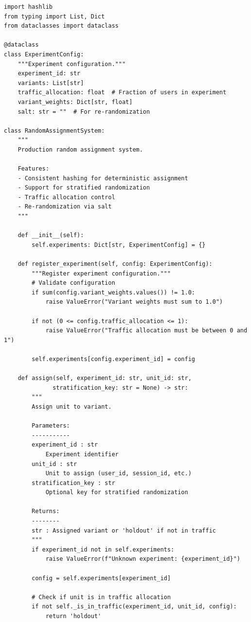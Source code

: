 \lstset{language=Python, caption=Production Random Assignment System}
\begin{lstlisting}
import hashlib
from typing import List, Dict
from dataclasses import dataclass

@dataclass
class ExperimentConfig:
    """Experiment configuration."""
    experiment_id: str
    variants: List[str]
    traffic_allocation: float  # Fraction of users in experiment
    variant_weights: Dict[str, float]
    salt: str = ""  # For re-randomization

class RandomAssignmentSystem:
    """
    Production random assignment system.

    Features:
    - Consistent hashing for deterministic assignment
    - Support for stratified randomization
    - Traffic allocation control
    - Re-randomization via salt
    """

    def __init__(self):
        self.experiments: Dict[str, ExperimentConfig] = {}

    def register_experiment(self, config: ExperimentConfig):
        """Register experiment configuration."""
        # Validate configuration
        if sum(config.variant_weights.values()) != 1.0:
            raise ValueError("Variant weights must sum to 1.0")

        if not (0 <= config.traffic_allocation <= 1):
            raise ValueError("Traffic allocation must be between 0 and 1")

        self.experiments[config.experiment_id] = config

    def assign(self, experiment_id: str, unit_id: str,
              stratification_key: str = None) -> str:
        """
        Assign unit to variant.

        Parameters:
        -----------
        experiment_id : str
            Experiment identifier
        unit_id : str
            Unit to assign (user_id, session_id, etc.)
        stratification_key : str
            Optional key for stratified randomization

        Returns:
        --------
        str : Assigned variant or 'holdout' if not in traffic
        """
        if experiment_id not in self.experiments:
            raise ValueError(f"Unknown experiment: {experiment_id}")

        config = self.experiments[experiment_id]

        # Check if unit is in traffic allocation
        if not self._is_in_traffic(experiment_id, unit_id, config):
            return 'holdout'


\end{lstlisting}
